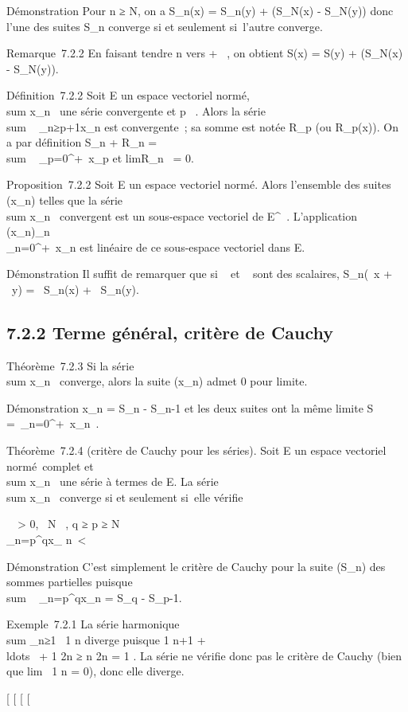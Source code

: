 \documentclass[]{article}
\begin{document}
Démonstration Pour n ≥ N, on a S_n(x) = S_n(y) +
(S_N(x) - S_N(y)) donc l'une des suites S_n
converge si et seulement si~l'autre converge.

Remarque~7.2.2 En faisant tendre n vers + \infty~, on obtient S(x) = S(y) +
(S_N(x) - S_N(y)).

Définition~7.2.2 Soit E un espace vectoriel normé,
\\sum  x_n~ une
série convergente et p \in {}~. Alors la série
\\sum ~
_n≥p+1x_n est convergente~; sa somme est notée
R_p (ou R_p(x)). On a par définition S_n +
R_n = \\sum ~
_p=0^+\infty~x_p et
limR_n~ = 0.

Proposition~7.2.2 Soit E un espace vectoriel normé. Alors l'ensemble des
suites (x_n) telles que la série
\\sum  x_n~
convergent est un sous-espace vectoriel de E^~. L'application
(x_n)_n\in{}~\mapsto~\\\sum
 _n=0^+\infty~x_n est linéaire de ce sous-espace
vectoriel dans E.

Démonstration Il suffit de remarquer que si \alpha~ et \beta~ sont des scalaires,
S_n(\alpha~x + \beta~y) = \alpha~S_n(x) + \beta~S_n(y).

\subsection{7.2.2 Terme général, critère de Cauchy}

Théorème~7.2.3 Si la série
\\sum  x_n~
converge, alors la suite (x_n) admet 0 pour limite.

Démonstration x_n = S_n - S_n-1 et les deux
suites ont la même limite S =\
\sum  _n=0^+\infty~x_n~.

Théorème~7.2.4 (critère de Cauchy pour les séries). Soit E un espace
vectoriel normé~complet et
\\sum  x_n~ une
série à termes de E. La série
\\sum  x_n~
converge si et seulement si~elle vérifie

\forall~~\epsilon > 0,
\exists~N \in {}~, q ≥ p ≥ N
\rigtharrow~\\\sum
_n=p^qx_ n\
< \epsilon

Démonstration C'est simplement le critère de Cauchy pour la suite
(S_n) des sommes partielles puisque
\\sum ~
_n=p^qx_n = S_q - S_p-1.

Exemple~7.2.1 La série harmonique
\\sum  _n≥1~ 1
\over n diverge puisque  1 \over n+1
+ \\ldots~ + 1
n ≥ n  \over 2n = 1
\over 2 . La série ne vérifie donc pas le critère de
Cauchy (bien que lim~ 1 \over
n = 0), donc elle diverge.

[
[
[
[
\end{document}
